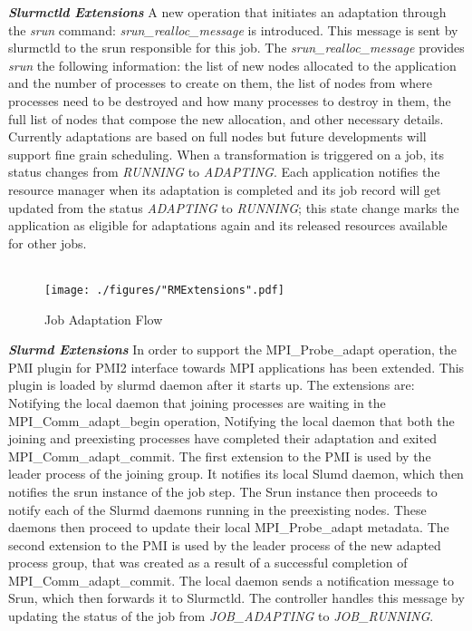 \textbf{\textit{Slurmctld Extensions}} A new operation that initiates an adaptation through the \textit{srun} command: \textit{srun{\_}realloc{\_}message} is introduced. This message is sent by slurmctld to the srun responsible for this job. The \textit{srun{\_}realloc{\_}message} provides \textit{srun} the following information: the list of new nodes allocated to the application and the number of processes to create on them, the list of nodes from where processes need to be destroyed and how many processes to destroy in them, the full list of nodes that compose the new allocation, and other necessary details. Currently adaptations are based on full nodes but future developments will support fine grain scheduling. When a transformation is triggered on a job, its status changes from \textit{RUNNING} to \textit{ADAPTING}. Each application notifies the resource manager when its adaptation is completed and its job record will get updated from the status \textit{ADAPTING} to \textit{RUNNING}; this state change marks the application as eligible for adaptations again and its released resources available for other jobs.\\ \\
\begin{figure}[t]
\vspace{-0.60cm}
\texttt{[image: ./figures/"RMExtensions".pdf]}
\caption{Job Adaptation Flow}
\label{fig:1}
\end{figure}
\noindent
\textbf{\textit{Slurmd Extensions}} In order to support the MPI{\_}Probe{\_}adapt operation, the PMI plugin for PMI2 interface towards MPI applications has been extended. This plugin is loaded by slurmd daemon after it starts up. The extensions are: Notifying the local daemon that joining processes are waiting in the MPI{\_}Comm{\_}adapt{\_}begin operation, Notifying the local daemon that both the joining and preexisting processes have completed their adaptation and exited MPI{\_}Comm{\_}adapt{\_}commit. The first extension to the PMI is used by the leader process of the joining group. It notifies its local Slumd daemon, which then notifies the srun instance of the job step. The Srun instance then proceeds to notify each of the Slurmd daemons running in the preexisting nodes. These daemons then proceed to update their local MPI{\_}Probe{\_}adapt metadata. The second extension to the PMI is used by the leader process of the new adapted process group, that was created as a result of a successful completion of MPI{\_}Comm{\_}adapt{\_}commit. The local daemon sends a notification message to Srun, which then forwards it to Slurmctld. The controller handles this message by updating the status of the job from \textit{JOB{\_}ADAPTING} to \textit{JOB{\_}RUNNING}.\\ \\
